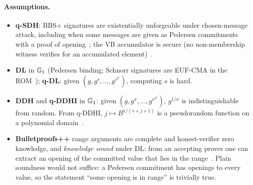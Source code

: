 \paragraph{Assumptions.}
\begin{itemize}[leftmargin=*]
\item \textbf{q-SDH}: BBS+ signatures are existentially unforgeable under chosen-message attack, including when some messages are given as Pedersen commitments with a proof of opening~\cite{au2006bbsplus,camenisch2016bbsplus,tessaro2023bbs}; the VB accumulator is secure (no non-membership witness verifies for an accumulated element)~\cite{vitto2022vb}.
\item \textbf{DL} in $\mathbb{G}_1$ (Pedersen binding; Schnorr signatures are EUF-CMA in the ROM~\cite{pointcheval2000}); \textbf{q-DL}: given $(g,g^{s},\dots,g^{s^{q'}})$, computing $s$ is hard.
\item \textbf{DDH} and \textbf{q-DDHI} in $\mathbb{G}_1$: given $(g,g^{x},\dots,g^{x^{q'}})$, $g^{1/x}$ is indistinguishable from random. From q-DDHI, $j\mapsto B^{1/(s+j+1)}$ is a pseudorandom function on a polynomial domain~\cite{dodis2005vrf,camenisch2006clonewars}.
\item \textbf{Bulletproofs++} range arguments are complete and honest-verifier zero knowledge, and \emph{knowledge sound} under DL: from an accepting prover one can extract an opening of the committed value that lies in the range~\cite{eagen2024bpp}. Plain soundness would not suffice: a Pedersen commitment has openings to every value, so the statement ``some opening is in range'' is trivially true.
\end{itemize}

